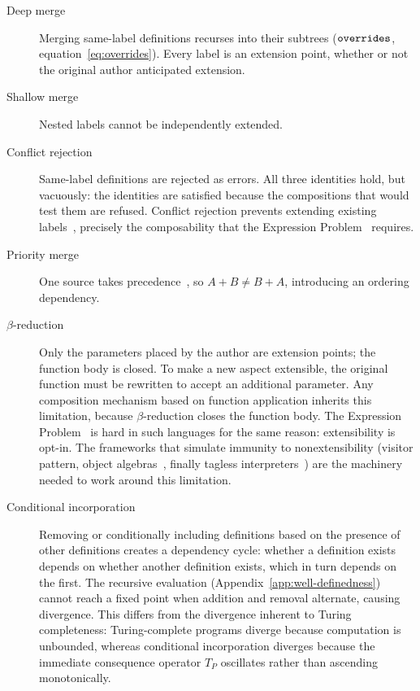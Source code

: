 \begin{description}
  \item[Deep merge]
    Merging same-label definitions recurses into their subtrees
    ($\mathtt{overrides}$, equation~\ref{eq:overrides}).
    Every label is an extension point, whether or not the
    original author anticipated extension.

  \item[Shallow merge]
    Nested labels cannot be independently extended.

  \item[Conflict rejection]
    Same-label definitions are rejected as errors.
    All three identities hold, but vacuously:
    the identities are satisfied because the compositions that
    would test them are refused.
    Conflict rejection prevents extending existing
    labels~\cite{harper1991-symmetric-record-concatenation}, precisely the composability that the
    Expression Problem~\cite{wadler1998-expression-problem} requires.

  \item[Priority merge]
    One source takes
    precedence~\cite{jsonnet,dolstra2010-nixos},
    so $A + B \neq B + A$, introducing
    an ordering dependency.

  \item[$\beta$-reduction]
    Only the parameters placed by the author are extension
    points; the function body is closed.
    To make a new aspect extensible, the original function must
    be rewritten to accept an additional parameter.
    Any composition mechanism based on function application
    inherits this limitation, because $\beta$-reduction
    closes the function body.
    The Expression Problem~\cite{wadler1998-expression-problem} is hard
    in such languages for the same reason:
    extensibility is opt-in.
    The frameworks that simulate immunity to nonextensibility
    (visitor pattern,
      object algebras~\cite{oliveira2012-object-algebras},
    finally tagless interpreters~\cite{carette2009-finally-tagless})
    are the machinery needed to work around this limitation.

  \item[Conditional incorporation]
    Removing or conditionally including definitions
    based on the presence of other definitions
    creates a dependency cycle:
    whether a definition exists depends on
    whether another definition exists, which in turn
    depends on the first.
    The recursive evaluation
    (Appendix~\ref{app:well-definedness}) cannot
    reach a fixed point when addition and removal
    alternate, causing divergence.
    This differs from the divergence inherent to
    Turing completeness: Turing-complete programs
    diverge because computation is unbounded, whereas
    conditional incorporation diverges because the
    immediate consequence operator $T_P$ oscillates
    rather than ascending monotonically.
\end{description}

